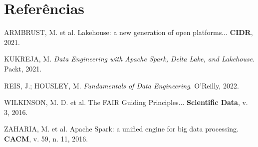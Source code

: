 \documentclass[12pt,a4paper,oneside]{article}
\begin{document}
\section*{Referências}
\begin{singlespace}\small
\noindent ARMBRUST, M. et al. Lakehouse: a new generation of open
platforms... \textbf{CIDR}, 2021.\par\smallskip
\noindent KUKREJA, M. \textit{Data Engineering with Apache Spark,
Delta Lake, and Lakehouse}. Packt, 2021.\par\smallskip
\noindent REIS, J.; HOUSLEY, M. \textit{Fundamentals of Data
Engineering}. O'Reilly, 2022.\par\smallskip
\noindent WILKINSON, M. D. et al. The FAIR Guiding Principles...
\textbf{Scientific Data}, v. 3, 2016.\par\smallskip
\noindent ZAHARIA, M. et al. Apache Spark: a unified engine for big
data processing. \textbf{CACM}, v. 59, n. 11, 2016.
\end{singlespace}
\end{document}
